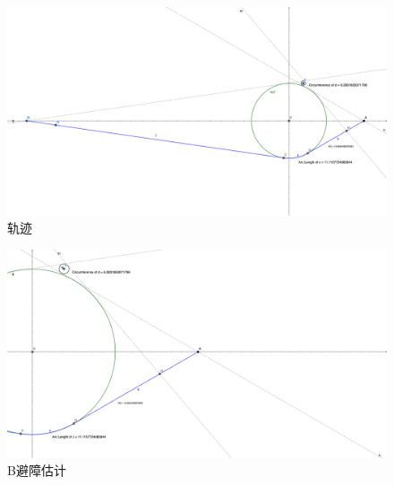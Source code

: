 \documentclass[withoutpreface,bwprint]{cumcmthesis}
\begin{document}
\begin{figure}
    \includegraphics[width=\textwidth]{whole.png}
    \caption{轨迹}
\end{figure}
\begin{figure}
    \includegraphics[width=\textwidth]{part.png}
    \caption{B避障估计}
\end{figure}








\end{document}
